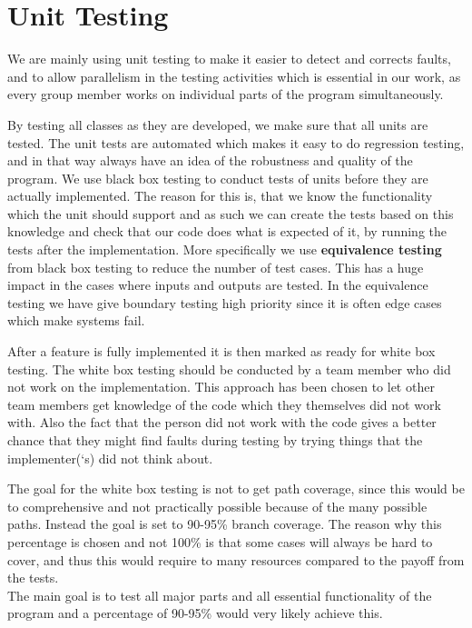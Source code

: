 \section{Unit Testing}
We are mainly using unit testing to make it easier to detect and corrects faults, and to allow parallelism in the testing activities which is essential in our work, as every group member works on individual parts of the program simultaneously.

By testing all classes as they are developed, we make sure that all units are tested. The unit tests are automated which makes it easy to do regression testing, and in that way always have an idea of the robustness and quality of the program.
We use black box testing to conduct tests of units before they are actually implemented. The reason for this is, that we know the functionality which the unit should support and as such we can create the tests based on this knowledge and check that our code does what is expected of it, by running the tests after the implementation.
More specifically we use \textbf{equivalence testing} from black box testing to reduce the number of test cases. This has a huge impact in the cases where inputs and outputs are tested. In the equivalence testing we have give boundary testing high priority since it is often edge cases which make systems fail.

After a feature is fully implemented it is then marked as ready for white box testing. The white box testing should be conducted by a team member who did not work on the implementation. This approach has been chosen to let other team members get knowledge of the code which they themselves did not work with. Also the fact that the person did not work with the code gives a better chance that they might find faults during testing by trying things that the implementer(`s) did not think about.

 The goal for the white box testing is not to get path coverage, since this would be to comprehensive and not practically possible because of the many possible paths. Instead the goal is set to 90-95\% branch coverage. The reason why this percentage is chosen and not 100\% is that some cases will always be hard to cover, and thus this would require to many resources compared to the payoff from the tests. \\
 The main goal is to test all major parts and all essential functionality of the program and a percentage of 90-95\% would very likely achieve this.